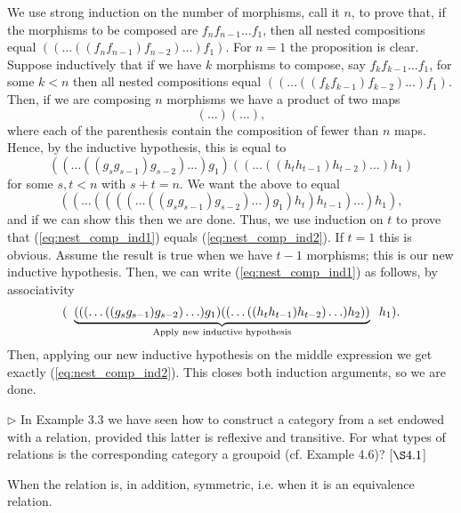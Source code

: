 \begin{solution}
	We use strong induction on the number of morphisms, call it $n$, to prove that, if the morphisms to be composed are \(f_n f_{n-1} \dots f_1\), then all nested compositions equal $((\dots ((f_n f_{n-1}) f_{n-2}) \dots )f_1)$. For $n = 1$ the proposition is clear. Suppose inductively that if we have $k$ morphisms to compose, say $f_k f_{k-1}\ldots f_1$, for some $k<n$ then all nested compositions equal $((\ldots ((f_kf_{k-1})f_{k-2})\ldots)f_1)$. Then, if we are composing $n$ morphisms we have a product of two maps
	\[
		(\ldots)(\ldots),
	\] 
	where each of the parenthesis contain the composition of fewer than $n$ maps. Hence, by the inductive hypothesis, this is equal to
	\begin{equation}\label{eq:nest_comp_ind1}
		((\ldots ((g_sg_{s-1})g_{s-2})\ldots)g_1)((\ldots ((h_th_{t-1})h_{t-2})\ldots)h_1)
	\end{equation}
	for some $s,t<n$ with $s+t = n$. We want the above to equal
	\begin{equation}\label{eq:nest_comp_ind2}
		((\ldots((((\ldots((g_sg_{s-1})g_{s-2})\ldots)g_1)h_t)h_{t-1})\ldots)h_1),
	\end{equation}
	and if we can show this then we are done. Thus, we use induction on $t$ to prove that (\ref{eq:nest_comp_ind1}) equals (\ref{eq:nest_comp_ind2}). If $t=1$ this is obvious. Assume the result is true when we have $t-1$ morphisms; this is our new inductive hypothesis. Then, we can write (\ref{eq:nest_comp_ind1}) as follows, by associativity
	\begin{gather*}
		(\;\; \underbrace{(((\ldots ((g_sg_{s-1})g_{s-2})\ldots)g_1)((\ldots ((h_th_{t-1})h_{t-2})\ldots)h_2))}_{\textnormal{Apply new inductive hypothesis}}\;\; h_1).
	\end{gather*}
	Then, applying our new inductive hypothesis on the middle expression we get exactly (\ref{eq:nest_comp_ind2}). This closes both induction arguments, so we are done.
	
\end{solution}

\begin{exercise}
	\(\triangleright\) In Example 3.3 we have seen how to construct a category from a set endowed with a relation, provided this latter is reflexive and transitive. For what types of relations is the corresponding category a groupoid (cf. Example 4.6)? [\(\S 4.1\)]
\end{exercise}
\begin{solution}
	When the relation is, in addition, symmetric, i.e. when it is an equivalence relation.
\end{solution}

